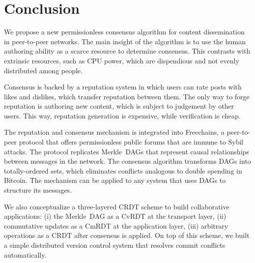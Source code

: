 \documentclass[10pt,journal,compsoc]{IEEEtran}
\newcommand{\FC}       {Freechains\xspace}
\begin{document}
\section{Conclusion}
\label{sec.conclusion}

We propose a new permissionless consensus algorithm for content dissemination
in peer-to-peer networks.
The main insight of the algorithm is to use the human authoring ability as a
scarce resource to determine consensus.
This contrasts with extrinsic resources, such as CPU power, which are
dispendious and not evenly distributed among people.%

Consensus is backed by a reputation system in which users can rate posts with
likes and dislikes, which transfer reputation between them.
The only way to forge reputation is authoring new content, which is subject to
judgement by other users.
This way, reputation generation is expensive, while verification is cheap.

The reputation and consensus mechanism is integrated into \FC, a peer-to-peer
protocol that offers permissionless public forums that are immune to Sybil
attacks.
The protocol replicates Merkle~DAGs that represent causal relationships between
messages in the network.
The consensus algorithm transforms DAGs into totally-ordered sets, which
eliminates conflicts analogous to double spending in Bitcoin.
The mechanism can be applied to any system that uses DAGs to structure its
messages.

We also conceptualize a three-layered CRDT scheme to build collaborative
applications:
    (i)   the Merkle~DAG as a CvRDT at the transport layer,
    (ii)  commutative updates as a CmRDT at the application layer,
    (iii) arbitrary operations as a CRDT after consensus is applied.
%
On top of this scheme, we built a simple distributed version control system
that resolves commit conflicts automatically.
\end{document}
